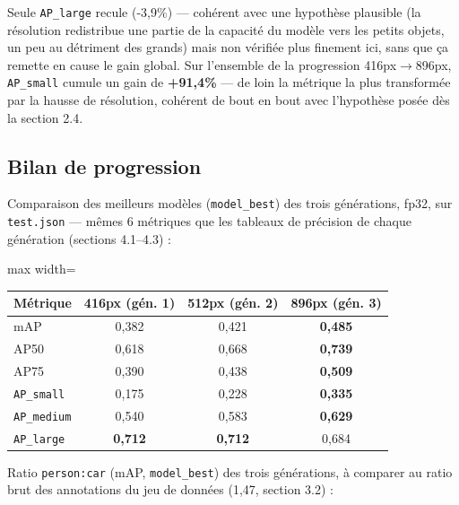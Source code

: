 \documentclass[11pt,a4paper]{article}
\let\Oldsubsection\subsection
\renewcommand{\subsection}{\FloatBarrier\Oldsubsection}
\begin{document}
    Seule \texttt{AP\_large} recule (-3,9\%) --- cohérent avec une
    hypothèse plausible (la résolution redistribue une partie de la
    capacité du modèle vers les petits objets, un peu au détriment des
    grands) mais non vérifiée plus finement ici, sans que ça remette en
    cause le gain global. Sur l'ensemble de la progression 416px$\to$896px,
    \texttt{AP\_small} cumule un gain de \textbf{+91,4\%} --- de loin la
    métrique la plus transformée par la hausse de résolution, cohérent de
    bout en bout avec l'hypothèse posée dès la section 2.4.
    
    \subsection{Bilan de progression}
    
    Comparaison des meilleurs modèles (\texttt{model\_best}) des trois
    générations, fp32, sur \texttt{test.json} --- mêmes 6 métriques que
    les tableaux de précision de chaque génération (sections 4.1--4.3) :
    
    \begin{table}[!htbp]
    \centering
    \small
    \begin{adjustbox}{max width=\linewidth}
    \begin{tabular}{@{}lccc@{}}
    \toprule
    \textbf{Métrique} & \textbf{416px (gén. 1)} & \textbf{512px (gén. 2)} & \textbf{896px (gén. 3)} \\
    \midrule
    mAP & 0,382 & 0,421 & \textbf{0,485} \\
    AP50 & 0,618 & 0,668 & \textbf{0,739} \\
    AP75 & 0,390 & 0,438 & \textbf{0,509} \\
    \texttt{AP\_small} & 0,175 & 0,228 & \textbf{0,335} \\
    \texttt{AP\_medium} & 0,540 & 0,583 & \textbf{0,629} \\
    \texttt{AP\_large} & \textbf{0,712} & \textbf{0,712} & 0,684 \\
    \bottomrule
    \end{tabular}
    \end{adjustbox}
    \end{table}
    
    Ratio \texttt{person:car} (mAP, \texttt{model\_best}) des trois
    générations, à comparer au ratio brut des annotations du jeu de
    données (1,47, section 3.2) :
    
\end{document}
